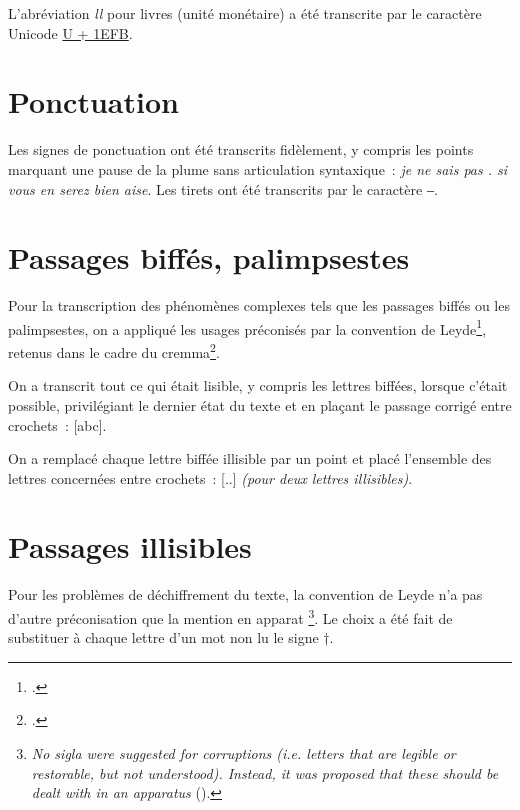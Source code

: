 \documentclass[a4paper,12pt,twoside]{book}
\newcommand{\langue}[1]{\emph{#1}}
\begin{document}
			L'abréviation \textit{ll} pour livres (unité monétaire) a été transcrite par le caractère Unicode \href{https://mufi.info/m.php?p=muficharinfo&i=4088}{U + 1EFB}.

		\section{Ponctuation}
			Les signes de ponctuation ont été transcrits fidèlement, y compris les points marquant une pause de la plume sans articulation syntaxique~: \textit{je ne sais pas . si vous en serez bien aise}. Les tirets ont été transcrits par le caractère ‒.
		
		\section{Passages biffés, palimpsestes}
			\label{biffes}
			Pour la transcription des phénomènes complexes tels que les passages biffés ou les palimpsestes, on a appliqué les usages préconisés par la convention de Leyde\footcite{leidenConvention}, retenus dans le cadre du \gls{cremma}\footcite{pincheSeminaireCreationModele2021a}.
			
			On a transcrit tout ce qui était lisible, y compris les lettres biffées, lorsque c'était possible, privilégiant le dernier état du texte et en plaçant le passage corrigé entre crochets~: [abc].
		
			On a remplacé chaque lettre biffée illisible par un point et placé l'ensemble des lettres concernées entre crochets~: [..] \textit{(pour deux lettres illisibles)}.
		
		\section{Passages illisibles}
			Pour les problèmes de déchiffrement du texte, la convention de Leyde n'a pas d'autre préconisation que la mention en apparat
			\footnote{\langue{No sigla were suggested for corruptions (i.e. letters that are legible or restorable, but not understood). Instead, it was proposed that these should be dealt with in an apparatus} (\cite{leidenConvention}).}.
			Le choix a été fait de substituer à chaque lettre d'un mot non lu le signe †.

	\pagestyle{empty}				
	\cleardoublepage
	\pagestyle{plain}					
      	
	\printglossaries

	\pagestyle{empty}				
	\cleardoublepage
	\pagestyle{plain}					
	
\end{document}
